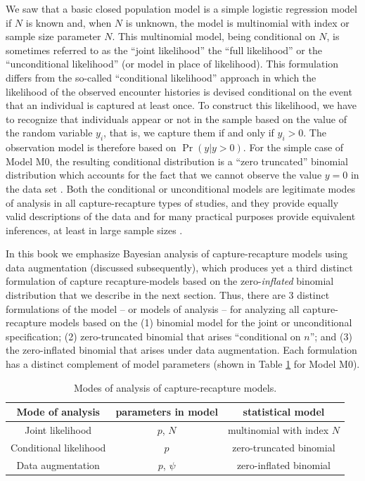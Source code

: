 We saw that a basic closed population model is a simple logistic
regression model if $N$ is known and, when $N$ is unknown, the model
is multinomial with index or sample size parameter $N$. This
multinomial model, being conditional on $N$, is sometimes referred to
as the ``joint likelihood'' the ``full likelihood'' or the
``unconditional likelihood'' (or model in place of likelihood). This
formulation differs from the so-called ``conditional likelihood''
approach in which the likelihood of the observed encounter histories
is devised conditional on the event that an individual is captured at
least once.  To construct this likelihood, we have to recognize that
individuals appear or not in the sample based on the value of the
random variable $y_{i}$, that is, we capture them if and only if
$y_{i}>0$.  The observation model is therefore based on $\Pr(y|y>0)$.
For the simple case of Model M0, the resulting conditional
distribution is a ``zero truncated'' binomial distribution which
accounts for the fact that we cannot observe the value $y=0$ in the
data set \citep[see][section XYZ]{royle_dorazio:2008}.  Both the
conditional or unconditional models are legitimate modes of analysis
in all capture-recapture types of studies, and they provide equally
valid descriptions of the data and for many practical purposes provide
equivalent inferences, at least in large sample sizes
\citep{sanathanan:1972}.

In this book we emphasize Bayesian analysis of capture-recapture
models using data augmentation (discussed subsequently), which
produces yet a third distinct formulation of capture recapture-models
based on the zero-{\it inflated} binomial distribution that we
describe in the next section.  Thus, there are 3 distinct formulations
of the model -- or models of analysis -- for analyzing all
capture-recapture models based on the (1) binomial model for the joint
or unconditional specification; (2) zero-truncated binomial that
arises ``conditional on $n$''; and (3) the zero-inflated binomial that
arises under data augmentation.  Each formulation has a distinct
complement of model parameters (shown in Table \ref{tab.3.modes} for
Model M0).


\begin{table}
\centering
\begin{tabular}{ccc}
Mode of analysis & parameters in model & statistical model \\ \hline
Joint likelihood                &	$p$, $N$	&	multinomial with index $N$\\
Conditional likelihood 		&	$p$	&	zero-truncated binomial \\
Data augmentation		&	$p$, $\psi$	&	zero-inflated binomial\\
\end{tabular}
\caption{Modes of analysis of capture-recapture models.}
\label{tab.3.modes}
\end{table}



